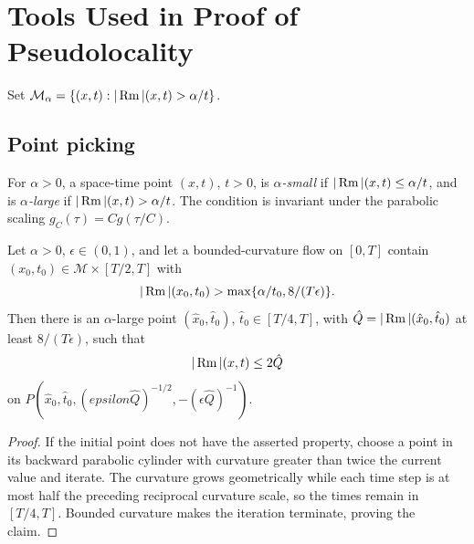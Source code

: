 \chapter[22]{Tools Used in Proof of Pseudolocality}
\label{ch:chow-iii-tools-pseudolocality}

Set \(\mathcal M_\alpha=\{(x,t):|\operatorname{Rm}|(x,t)>\alpha/t\}\).

\section{Point picking}

\begin{definition}
\label{def:chow-iii-alpha-small-large-curvature}

For \(\alpha>0\), a space-time point \((x,t)\), \(t>0\), is
\emph{\(\alpha\)-small} if \(|\operatorname{Rm}|(x,t)\le\alpha/t\), and is
\emph{\(\alpha\)-large} if \(|\operatorname{Rm}|(x,t)>\alpha/t\).  The condition is
invariant under the parabolic scaling \(g_C(\tau)=Cg(\tau/C)\).
\end{definition}

\begin{lemma}
\label{lem:chow-iii-large-curvature-local-control}

Let \(\alpha>0\), \(\epsilon\in(0,1)\), and let a bounded-curvature flow on
\([0,T]\) contain \((x_0,t_0)\in\mathcal M\times[T/2,T]\) with
\[
 |\operatorname{Rm}|(x_0,t_0)>\max\{\alpha/t_0,8/(T\epsilon)\}.
\]
Then there is an \(\alpha\)-large point \((\hat x_0,\hat t_0)\),
\(\hat t_0\in[T/4,T]\), with \(\hat Q=|\operatorname{Rm}|(\hat x_0,\hat t_0)\) at least
\(8/(T\epsilon)\), such that
\[
 |\operatorname{Rm}|(x,t)\le2\hat Q
\]
on \(P(\hat x_0,\hat t_0,(epsilon\hat Q)^{-1/2},-(\epsilon\hat Q)^{-1})\).
\end{lemma}
\begin{proof}
\sketch If the initial point does not have the asserted property, choose a point in
its backward parabolic cylinder with curvature greater than twice the current
value and iterate.  The curvature grows geometrically while each time step is
at most half the preceding reciprocal curvature scale, so the times remain in
\([T/4,T]\).  Bounded curvature makes the iteration terminate, proving the
claim.
\end{proof}

